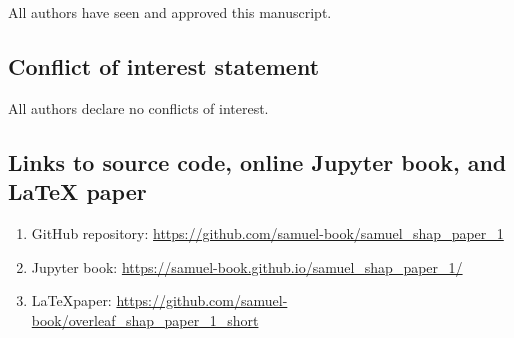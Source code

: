 All authors have seen and approved this manuscript.

\subsection*{Conflict of interest statement}

All authors declare no conflicts of interest.

\subsection*{Links to source code, online Jupyter book, and LaTeX paper}
\begin{enumerate}
    \item GitHub repository: \url{https://github.com/samuel-book/samuel_shap_paper_1} \cite{samuel_paper_1_github}
    \item Jupyter book: \url{https://samuel-book.github.io/samuel_shap_paper_1/}
    \item \LaTeX paper: \url{https://github.com/samuel-book/overleaf_shap_paper_1_short}
\end{enumerate}
